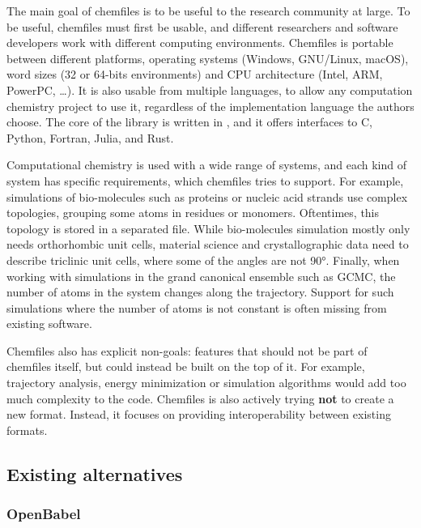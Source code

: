 \documentclass[thesis]{subfiles}
\begin{document}
The main goal of chemfiles is to be useful to the research community at large.
To be useful, chemfiles must first be usable, and different researchers and
software developers work with different computing environments. Chemfiles is
portable between different platforms, operating systems (Windows, GNU/Linux,
macOS), word sizes (32 or 64-bits environments) and CPU architecture (Intel,
ARM, PowerPC, \dots). It is also usable from multiple languages, to allow any
computation chemistry project to use it, regardless of the implementation
language the authors choose. The core of the library is written in \cxx, and it
offers interfaces to C, Python, Fortran, Julia, and Rust.

Computational chemistry is used with a wide range of systems, and each kind of
system has specific requirements, which chemfiles tries to support. For
example, simulations of bio-molecules such as proteins or nucleic acid strands
use complex topologies, grouping some atoms in residues or monomers.
Oftentimes, this topology is stored in a separated file. While bio-molecules
simulation mostly only needs orthorhombic unit cells, material science and
crystallographic data need to describe triclinic unit cells, where some of the
angles are not 90°. Finally, when working with simulations in the grand
canonical ensemble such as GCMC, the number of atoms in the system changes along
the trajectory. Support for such simulations where the number of atoms is not
constant is often missing from existing software.

Chemfiles also has explicit non-goals: features that should not be part of
chemfiles itself, but could instead be built on the top of it. For example,
trajectory analysis, energy minimization or simulation algorithms would add too
much complexity to the code. Chemfiles is also actively trying \textbf{not} to
create a new format. Instead, it focuses on providing interoperability between
existing formats.

\subsection{Existing alternatives}


\subsubsection{OpenBabel}
\end{document}
